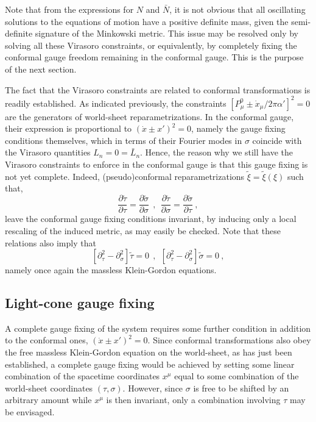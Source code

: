 \documentclass[a4paper,11pt]{article}
\begin{document}
Note that from the expressions for $N$ and $\bar{N}$, it is not obvious
that all oscillating solutions to the equations of motion have a positive 
definite mass, given the semi-definite signature of the Minkowski metric.
This issue may be resolved only by solving all these Virasoro constraints,
or equivalently, by completely fixing the conformal gauge freedom remaining
in the conformal gauge. This is the purpose of the next section.

The fact that the Virasoro constraints are related to conformal 
transformations is readily established. As indicated previously,
the constraints $[P^0_\mu\pm\dot{x}_\mu/2\pi\alpha']^2=0$ are the generators
of world-sheet reparametrizations. In the conformal gauge, their expression
is proportional to $(\dot{x}\pm x')^2=0$, namely the gauge fixing conditions
themselves, which in terms of their Fourier modes in $\sigma$ coincide
with the Virasoro quantities $L_n=0=\bar{L}_n$. Hence, the reason
why we still have the Virasoro constraints to enforce in the conformal
gauge is that this gauge fixing is not yet complete. Indeed,
(pseudo)conformal reparametrizations $\tilde{\xi}=\tilde{\xi}(\xi)$ such that,
\begin{equation}
\frac{\partial\tilde{\tau}}{\partial\tau}=
\frac{\partial\tilde{\sigma}}{\partial\sigma}\ \ ,\ \ 
\frac{\partial\tilde{\tau}}{\partial\sigma}=
\frac{\partial\tilde{\sigma}}{\partial\tau}\ ,
\end{equation}
leave the conformal gauge fixing conditions invariant, by inducing only
a local rescaling of the induced metric, as may easily be checked. Note that
these relations also imply that
\begin{equation}
\left[\partial^2_\tau-\partial^2_\sigma\right]\tilde{\tau}=0\ \ ,\ \ 
\left[\partial^2_\tau-\partial^2_\sigma\right]\tilde{\sigma}=0\ ,
\end{equation}
namely once again the massless Klein-Gordon equations.

\subsection{Light-cone gauge fixing}
\label{Subsect7.3}

A complete gauge fixing of the system requires some further condition
in addition to the conformal ones, $(\dot{x}\pm x')^2=0$. Since conformal
transformations also obey the free massless Klein-Gordon equation on the
world-sheet, as has just been established, a complete gauge fixing would
be achieved by setting some linear combination of the spacetime coordinates
$x^\mu$ equal to some combination of the world-sheet coordinates 
$(\tau,\sigma)$. However, since $\sigma$ is free to be shifted by an arbitrary
amount while $x^\mu$ is then invariant, only a combination involving $\tau$
may be envisaged.
\end{document}
